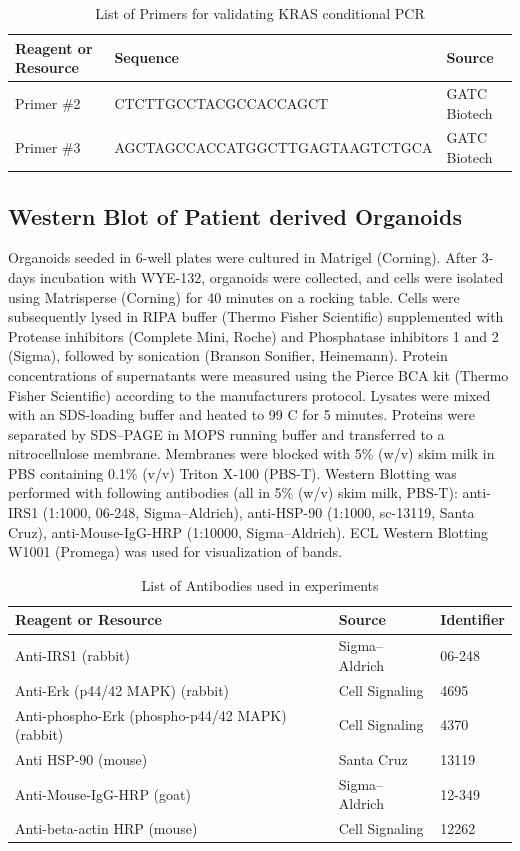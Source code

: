 \begin{flushleft}
\begin{table}[htb]
\caption{List of Primers for validating KRAS conditional PCR}
\label{tab:kras} %
\begin{tabularx}{\textwidth}{XlX}
\toprule
\textbf{Reagent or Resource} & \textbf{Sequence} & \textbf{Source} \\
\midrule
Primer \#2 & CTCTTGCCTACGCCACCAGCT & GATC Biotech \\
Primer \#3 & AGCTAGCCACCATGGCTTGAGTAAGTCTGCA & GATC Biotech \\
\bottomrule
\end{tabularx}
\end{table}

\subsection{Western Blot of Patient derived Organoids}
Organoids seeded in 6-well plates were cultured in Matrigel (Corning). After 3-days incubation with WYE-132, organoids were collected, and cells were isolated using Matrisperse (Corning) for 40 minutes on a rocking table. Cells were subsequently lysed in RIPA buffer (Thermo Fisher Scientific) supplemented with Protease inhibitors (Complete Mini, Roche) and Phosphatase inhibitors 1 and 2 (Sigma), followed by sonication (Branson Sonifier, Heinemann). Protein concentrations of supernatants were measured using the Pierce BCA kit (Thermo Fisher Scientific) according to the manufacturers protocol. Lysates were mixed with an SDS-loading buffer and heated to 99 C for 5 minutes. Proteins were separated by SDS–PAGE in MOPS running buffer and transferred to a nitrocellulose membrane. Membranes were blocked with 5\% (w/v) skim milk in PBS containing 0.1\% (v/v) Triton X-100 (PBS-T). Western Blotting was performed with following antibodies (all in 5\% (w/v) skim milk, PBS-T): anti-IRS1 (1:1000, 06-248, Sigma–Aldrich), anti-HSP-90 (1:1000, sc-13119, Santa Cruz), anti-Mouse-IgG-HRP (1:10000, Sigma–Aldrich). ECL Western Blotting W1001 (Promega) was used for visualization of bands.

\begin{table}[htb]
\caption{List of Antibodies used in experiments}
\label{tab:antibodies} %
\begin{tabularx}{\textwidth}{Xll}
\toprule
\textbf{Reagent or Resource} & \textbf{Source} & \textbf{Identifier} \\
\midrule
Anti-IRS1 (rabbit) & Sigma–Aldrich & 06-248 \\
Anti-Erk (p44/42 MAPK) (rabbit) & Cell Signaling & 4695 \\
Anti-phospho-Erk (phospho-p44/42 MAPK) (rabbit) & Cell Signaling & 4370 \\
Anti HSP-90 (mouse) & Santa Cruz & 13119 \\
Anti-Mouse-IgG-HRP (goat) & Sigma–Aldrich & 12-349 \\ 
Anti-beta-actin HRP (mouse) & Cell Signaling & 12262 \\
\bottomrule
\end{tabularx}
\end{table}


\end{flushleft}
